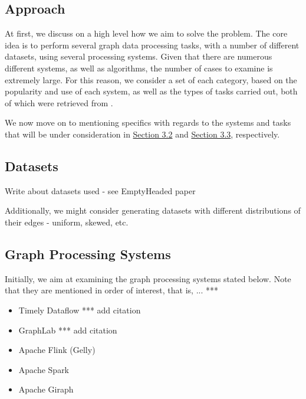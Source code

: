 \documentclass[a4paper,11pt]{article}
\begin{document}
\subsection{Approach} \label{approach}

\par At first, we discuss on a high level how we aim to solve the problem. The core idea is to perform several graph data processing tasks, with a number of different datasets, using several processing systems. Given that there are numerous different systems, as well as algorithms, the number of cases to examine is extremely large. For this reason, we consider a set of each category, based on the popularity and use of each system, as well as the types of tasks carried out, both of which were retrieved from \cite{survey}.

\medskip

\par We now move on to mentioning specifics with regards to the systems and tasks that will be under consideration in \hyperref[graph-proc]{Section 3.2}  and \hyperref[algos]{Section 3.3}, respectively.


\subsection{Datasets} \label{datasets}

\par Write about datasets used - see EmptyHeaded paper

\medskip

\par Additionally, we might consider generating datasets with different distributions of their edges - uniform, skewed, etc.



\subsection{Graph Processing Systems} \label{graph-proc}

\par Initially, we aim at examining the graph processing systems stated below. Note that they are mentioned in order of interest, that is, ... ***

\begin{itemize}

	\item Timely Dataflow *** add citation
	\item GraphLab *** add citation
	\item Apache Flink (Gelly) \cite{flink}
	\item Apache Spark \cite{spark}
	\item Apache Giraph \cite{giraph}

\end{itemize}
\end{document}
